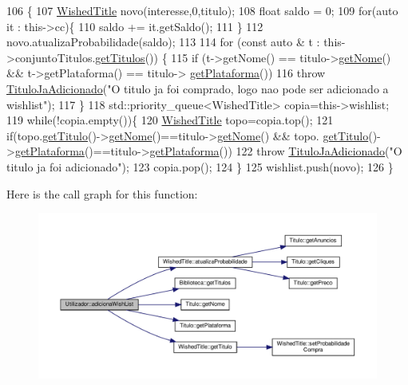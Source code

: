 \begin{DoxyCode}
106                                                                   \{
107     \hyperlink{classWishedTitle}{WishedTitle} novo(interesse,0,titulo);
108     \textcolor{keywordtype}{float} saldo = 0;
109     \textcolor{keywordflow}{for}(\textcolor{keyword}{auto} it : this->cc)\{
110         saldo += it.getSaldo();
111     \}
112     novo.atualizaProbabilidade(saldo);
113 
114     \textcolor{keywordflow}{for} (\textcolor{keyword}{const} \textcolor{keyword}{auto} & t : this->conjuntoTitulos.\hyperlink{classBiblioteca_a03c1ebf76a4ace4f57000bb99a87bb88}{getTitulos}()) \{
115         \textcolor{keywordflow}{if} (t->getNome() == titulo->\hyperlink{classTitulo_acb79279860b3404c6419697df5f860cb}{getNome}() && t->getPlataforma() == titulo->
      \hyperlink{classTitulo_a2a57a31d40c5df012b3c6e2451c253dd}{getPlataforma}())
116             \textcolor{keywordflow}{throw} \hyperlink{classTituloJaAdicionado}{TituloJaAdicionado}(\textcolor{stringliteral}{"O titulo ja foi comprado, logo nao pode ser
       adicionado a wishlist"});
117     \}
118     std::priority\_queue<WishedTitle> copia=this->wishlist;
119     \textcolor{keywordflow}{while}(!copia.empty())\{
120         \hyperlink{classWishedTitle}{WishedTitle} topo=copia.top();
121         \textcolor{keywordflow}{if}(topo.\hyperlink{classWishedTitle_a9ca6e92a26bb2f319a39d5a03b0c42bd}{getTitulo}()->\hyperlink{classTitulo_acb79279860b3404c6419697df5f860cb}{getNome}()==titulo->\hyperlink{classTitulo_acb79279860b3404c6419697df5f860cb}{getNome}() && topo.
      \hyperlink{classWishedTitle_a9ca6e92a26bb2f319a39d5a03b0c42bd}{getTitulo}()->\hyperlink{classTitulo_a2a57a31d40c5df012b3c6e2451c253dd}{getPlataforma}()==titulo->\hyperlink{classTitulo_a2a57a31d40c5df012b3c6e2451c253dd}{getPlataforma}())
122             \textcolor{keywordflow}{throw} \hyperlink{classTituloJaAdicionado}{TituloJaAdicionado}(\textcolor{stringliteral}{"O titulo ja foi adicionado"});
123         copia.pop();
124     \}
125     wishlist.push(novo);
126 \}
\end{DoxyCode}
Here is the call graph for this function\+:
\nopagebreak
\begin{figure}[H]
\begin{center}
\leavevmode
\includegraphics[width=350pt]{classUtilizador_a45ee0a8d988adbd537e2506d80f96cfb_cgraph}
\end{center}
\end{figure}
